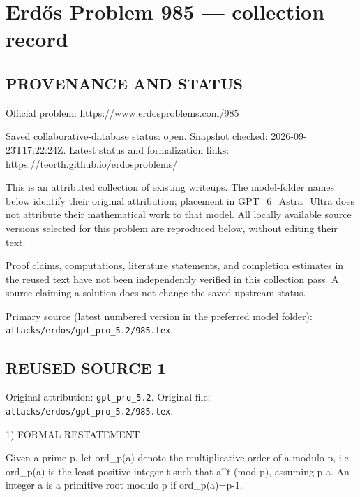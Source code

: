 \section*{Erd\H{o}s Problem 985 --- collection record}

\subsection*{PROVENANCE AND STATUS}
Official problem: https://www.erdosproblems.com/985

Saved collaborative-database status: open.
Snapshot checked: 2026-09-23T17:22:24Z.
Latest status and formalization links: https://teorth.github.io/erdosproblems/

This is an attributed collection of existing writeups. The model-folder names below identify their original attribution; placement in GPT\_6\_Astra\_Ultra does not attribute their mathematical work to that model. All locally available source versions selected for this problem are reproduced below, without editing their text.

Proof claims, computations, literature statements, and completion estimates in the reused text have not been independently verified in this collection pass. A source claiming a solution does not change the saved upstream status.

Primary source (latest numbered version in the preferred model folder): \texttt{attacks/erdos/gpt\_pro\_5.2/985.tex}.

\subsection*{REUSED SOURCE 1}
Original attribution: \texttt{gpt\_pro\_5.2}.
Original file: \texttt{attacks/erdos/gpt\_pro\_5.2/985.tex}.


1) FORMAL RESTATEMENT

Given a prime p, let ord_p(a) denote the multiplicative order of a modulo p, i.e.
ord_p(a) is the least positive integer t such that a^t  (mod p), assuming p \nmid a.
An integer a is a primitive root modulo p if ord_p(a)=p-1.

